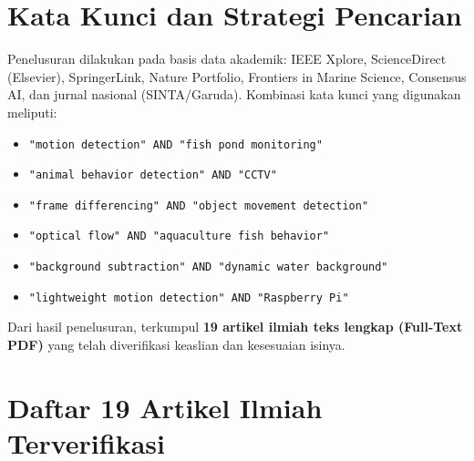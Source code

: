 \documentclass[11pt,a4paper]{article}
\begin{document}
\section{Kata Kunci dan Strategi Pencarian}
Penelusuran dilakukan pada basis data akademik: IEEE Xplore, ScienceDirect (Elsevier), SpringerLink, Nature Portfolio, Frontiers in Marine Science, Consensus AI, dan jurnal nasional (SINTA/Garuda).
Kombinasi kata kunci yang digunakan meliputi:
\begin{itemize}
    \item \texttt{"motion detection" AND "fish pond monitoring"}
    \item \texttt{"animal behavior detection" AND "CCTV"}
    \item \texttt{"frame differencing" AND "object movement detection"}
    \item \texttt{"optical flow" AND "aquaculture fish behavior"}
    \item \texttt{"background subtraction" AND "dynamic water background"}
    \item \texttt{"lightweight motion detection" AND "Raspberry Pi"}
\end{itemize}
Dari hasil penelusuran, terkumpul \textbf{19 artikel ilmiah teks lengkap (Full-Text PDF)} yang telah diverifikasi keaslian dan kesesuaian isinya.

\section{Daftar 19 Artikel Ilmiah Terverifikasi}
\end{document}
